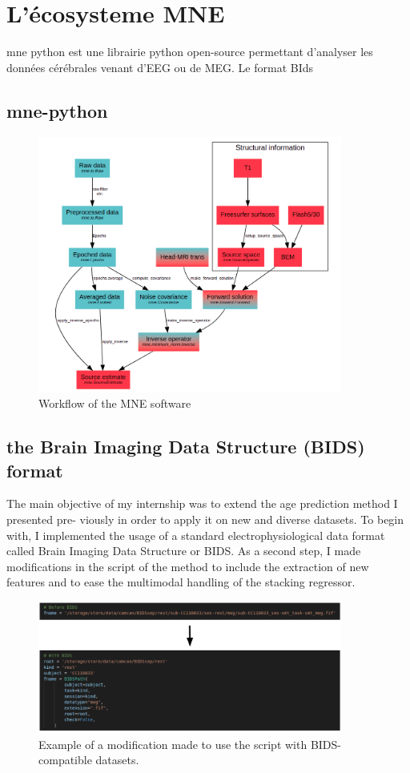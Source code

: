 \section{L'écosysteme MNE}

mne python est une librairie python open-source permettant d'analyser les données cérébrales venant d'EEG ou de MEG. Le format BIds

\subsection{mne-python}


\begin{figure}[h]
    \centering
    \includegraphics[width=10cm]{images_report/workflow_of_the_mne_software.png}
    \caption{Workflow of the MNE software \cite{GramfortEtAl2013a}}
\end{figure}


\subsection{the Brain Imaging Data Structure (BIDS) format}

The main objective of my internship was to extend the age prediction method I presented pre-
viously in order to apply it on new and diverse datasets. To begin with, I implemented the usage
of a standard electrophysiological data format called Brain Imaging Data Structure or BIDS. As
a second step, I made modifications in the script of the method to include the extraction of new
features and to ease the multimodal handling of the stacking regressor.

\begin{figure}[ht]
    \centering
    \includegraphics[width=10cm]{images_report/bids_example.png}
    \caption{Example of a modification made to use the script with BIDS-compatible datasets.}
    \label{bids_example}
\end{figure}

